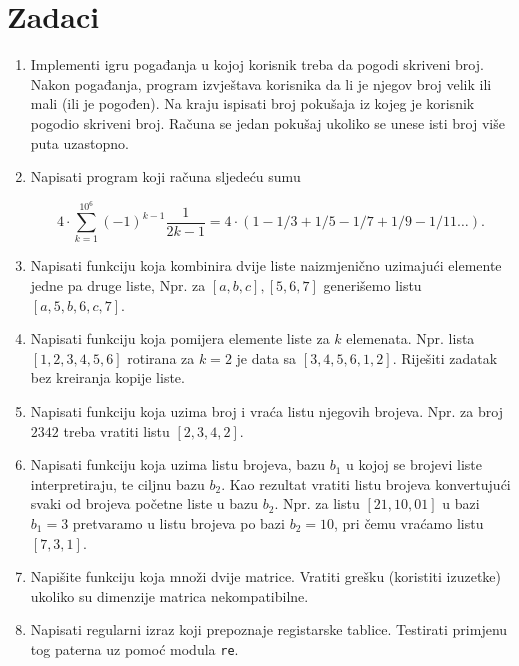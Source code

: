 \section*{Zadaci}
\begin{enumerate}
    
    \item Implementi igru pogađanja u kojoj korisnik treba da pogodi skriveni broj. Nakon pogađanja, program izvještava korisnika da li je njegov broj velik ili mali (ili je pogođen). Na kraju ispisati broj  pokušaja iz kojeg je korisnik pogodio skriveni broj. Računa se jedan pokušaj ukoliko se unese isti broj više puta uzastopno.
    
    
	\item Napisati program koji računa sljedeću sumu  
	
	$$ 4 \cdot \sum_{k=1}^{10^6}(-1)^{k-1} \frac{1}{2k-1}= 4 \cdot (1-1/3 + 1/5-1/7+1/9-1/11 \ldots).$$
	
	\item Napisati funkciju koja kombinira dvije liste naizmjenično uzimajući elemente jedne pa druge liste, Npr. za $[a,b,c], [5, 6, 7]$ generišemo listu $[a,5,b,6,c,7]$.
	
	\item Napisati funkciju koja pomijera elemente liste za $k$ elemenata. Npr. lista  $[1,2,3,4,5,6]$ rotirana za $k=2$ je data sa $[3,4,5,6,1,2]$. Riješiti zadatak bez kreiranja kopije liste. 
	
	\item Napisati funkciju koja uzima broj i vraća listu njegovih brojeva. Npr. za broj $2342$ treba vratiti listu $[2,3,4,2]$.
	
	\item Napisati funkciju koja uzima listu brojeva,   bazu $b_1$ u kojoj se brojevi liste interpretiraju, te ciljnu bazu $b_2$.  Kao rezultat vratiti listu brojeva konvertujući svaki od brojeva početne liste u bazu $b_2$. Npr. za listu $[21,10,01]$ u bazi $b_1 = 3$ pretvaramo u listu brojeva po bazi $b_2=10$, pri čemu vraćamo listu $[7,3, 1]$.
	
	\item Napišite funkciju koja množi dvije matrice. Vratiti grešku (koristiti izuzetke) ukoliko su dimenzije matrica nekompatibilne.  
	 
	\item Napisati regularni izraz koji prepoznaje registarske tablice. Testirati primjenu tog paterna uz pomoć modula \texttt{re}.
	

\end{enumerate}
